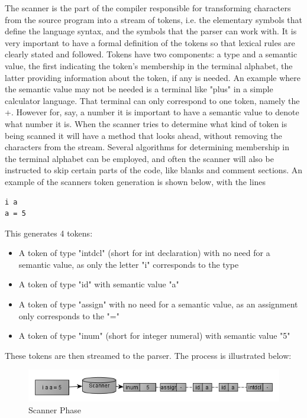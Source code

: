 The scanner is the part of the compiler responsible for transforming characters from the source program into a stream of tokens, i.e. the elementary symbols that define the language syntax, and the symbols that the parser can work with.
It is very important to have a formal definition of the tokens so that lexical rules are clearly stated and followed.
Tokens have two components: a type and a semantic value, the first indicating the token's membership in the terminal alphabet, the latter providing information about the token, if any is needed.
An example where the semantic value may not be needed is a terminal like "plus" in a simple calculator language. That terminal can only correspond to one token, namely the +. However for, say, a number it is important to have a semantic value to denote what number it is.
When the scanner tries to determine what kind of token is being scanned it will have a method that looks ahead, without removing the characters from the stream. Several algorithms for determining membership in the terminal alphabet can be employed, and often the scanner will also be instructed to skip certain parts of the code, like blanks and comment sections.
An example of the scanners token generation is shown below, with the lines
\begin{lstlisting}
i a 
a = 5
\end{lstlisting}

This generates 4 tokens: 
\begin{itemize}
\item A token of type "intdcl" (short for int declaration) with no need for a semantic value, as only the letter "i" corresponds to the type 
\item A token of type "id" with semantic value "a" 
\item A token of type "assign" with no need for a semantic value, as an assignment only corresponds to the "="
\item A token of type "inum" (short for integer numeral) with semantic value "5"
\end{itemize}

These tokens are then streamed to the parser. The process is illustrated below:
\begin{figure}[ht]
	\centering
		\includegraphics[scale = 0.6]{img/scanner.png}
	\caption{Scanner Phase}
	\label{fig:scanner}
\end{figure}


